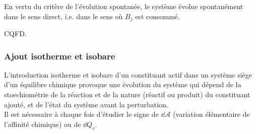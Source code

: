 \documentclass{article}
\begin{document}
\begin{tableau}
\begin{itemize}
\begin{figure}[H]
        \end{figure}
        En vertu du critère de l'évolution spontanée, le système évolue spontanément dans le sens direct, i.e. dans le sens où $B_j$ est consommé.
    \end{itemize}
    CQFD.
\end{tableau}

\subsubsection{Ajout isotherme et isobare}
L’introduction isotherme et isobare d’un constituant actif dans un système siège d’un équilibre chimique provoque une évolution du système qui dépend de la stoechiométrie de la réaction et de la nature (réactif ou produit) du constituant ajouté, et de l’état du système avant la perturbation.\\
Il est nécessaire à chaque fois d’étudier le signe de $\dd{\mathscr{A}}$ (variation élémentaire de l’affinité chimique) ou de $\dd{Q_r}$.
\end{document}
